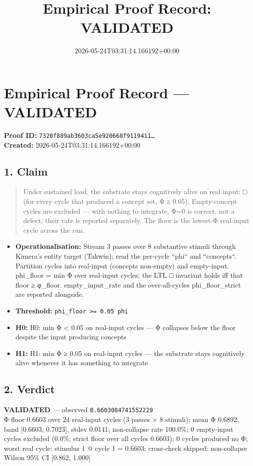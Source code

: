 \documentclass{article}
\title{Empirical Proof Record: VALIDATED}
\date{2026-05-24T03:31:14.166192+00:00}
\begin{document}
\maketitle
\section*{Empirical Proof Record --- \textcolor{validated}{\textbf{VALIDATED}}}
\textbf{Proof ID:} \texttt{7320f889ab3603ca5e920668f9119411\dots}\\
\textbf{Created:} 2026-05-24T03:31:14.166192+00:00
\subsection*{1. Claim}
\begin{quote}Under sustained load, the substrate stays cognitively alive on real input: □ (for every cycle that produced a concept set, Φ ≥ 0.05). Empty-concept cycles are excluded — with nothing to integrate, Φ=0 is correct, not a defect; their rate is reported separately. The floor is the lowest-Φ real-input cycle across the run.\end{quote}
\begin{itemize}
\item \textbf{Operationalisation:} Stream 3 passes over 8 substantive stimuli through Kimera's entity target (Takwin); read the per-cycle ``phi`` and ``concepts``. Partition cycles into real-input (concepts non-empty) and empty-input. phi\_floor = min Φ over real-input cycles; the LTL □ invariant holds iff that floor ≥ φ\_floor. empty\_input\_rate and the over-all-cycles phi\_floor\_strict are reported alongside.
\item \textbf{Threshold:} \texttt{phi\_floor >= 0.05 phi}
\item \textbf{H0:} H0: min Φ < 0.05 on real-input cycles — Φ collapses below the floor despite the input producing concepts
\item \textbf{H1:} H1: min Φ ≥ 0.05 on real-input cycles — the substrate stays cognitively alive whenever it has something to integrate
\end{itemize}
\subsection*{2. Verdict}
\textcolor{validated}{\textbf{VALIDATED}} --- observed \texttt{0.6603084741552229}\\
Φ floor 0.6603 over 24 real-input cycles (3 passes × 8 stimuli); mean Φ 0.6892, band [0.6603, 0.7023], stdev 0.0141; non-collapse rate 100.0\%; 0 empty-input cycles excluded (0.0\%; strict floor over all cycles 0.6603); 0 cycles produced no Φ; worst real cycle: stimulus 1 @ cycle 1 = 0.6603; cross-check skipped: non-collapse Wilson 95\% CI [0.862, 1.000]
\end{document}
